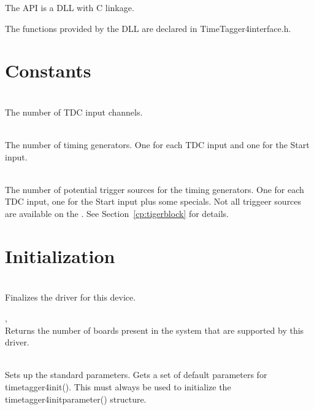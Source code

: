 The API is a DLL with C linkage.\par

The functions provided by the DLL are declared in \textsf{TimeTagger4\tu interface.h}.

\section{Constants}

	\\
	The number of TDC input channels.\par

	\\
	The number of timing generators. One for each TDC input and one for the Start input.\par

	\\
	The number of potential trigger sources for the timing generators. One for each TDC input, one for the Start input plus some specials. 
	Not all triggeer sources are available on the \deviceName . See Section~\ref{cp:tigerblock} for details.\par

\section{Initialization}
		\\
		Finalizes the driver for this device.

		, \\
		Returns the number of boards present in the system that are supported by this driver.\par

		\\
		Sets up the standard parameters. Gets a set of default parameters for \textsf{timetagger4\tu init()}. This must always be used to initialize the \textsf{timetagger4\tu init\tu parameter()} structure.\par

